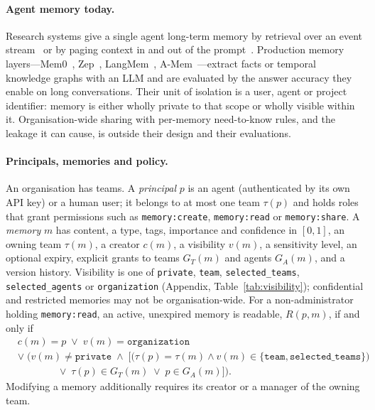 \documentclass[11pt,a4paper]{article}
\theoremstyle{remark}
\begin{document}
\paragraph{Agent memory today.} Research systems give a single agent long-term memory by retrieval over an
event stream~\cite{park2023generative} or by paging context in and out of the prompt~\cite{packer2023memgpt}.
Production memory layers---Mem0~\cite{chhikara2025mem0}, Zep~\cite{rasmussen2025zep},
LangMem~\cite{langmem2025}, A-Mem~\cite{xu2025amem}---extract facts or temporal knowledge graphs with an LLM
and are evaluated by the answer accuracy they enable on long conversations. Their unit of isolation is a
user, agent or project identifier: memory is either wholly private to that scope or wholly visible within it.
Organisation-wide sharing with per-memory need-to-know rules, and the leakage it can cause, is outside their
design and their evaluations.

\paragraph{Principals, memories and policy.} An organisation has teams. A \emph{principal} $p$ is an agent
(authenticated by its own API key) or a human user; it belongs to at most one team $\tau(p)$ and holds roles
that grant permissions such as \texttt{memory:create}, \texttt{memory:read} or \texttt{memory:share}. A
\emph{memory} $m$ has content, a type, tags, importance and confidence in $[0,1]$, an owning team $\tau(m)$,
a creator $c(m)$, a visibility $v(m)$, a sensitivity level, an optional expiry, explicit grants to teams
$G_T(m)$ and agents $G_A(m)$, and a version history. Visibility is one of \texttt{private}, \texttt{team},
\texttt{selected\_teams}, \texttt{selected\_agents} or \texttt{organization} (Appendix, Table~\ref{tab:visibility});
confidential and restricted memories may not be organisation-wide. For a non-administrator holding
\texttt{memory:read}, an active, unexpired memory is readable, $R(p,m)$, if and only if
\begin{equation}
\begin{split}
& c(m) = p \;\lor\; v(m) = \texttt{organization} \\
& \lor\; \Big( v(m) \neq \texttt{private} \;\land\; \big[ \big(\tau(p) = \tau(m) \land v(m) \in \{\texttt{team}, \texttt{selected\_teams}\}\big) \\
& \qquad\qquad \lor\; \tau(p) \in G_T(m) \;\lor\; p \in G_A(m) \big] \Big).
\end{split}
\label{eq:read}
\end{equation}
Modifying a memory additionally requires its creator or a manager of the owning team.
\end{document}
